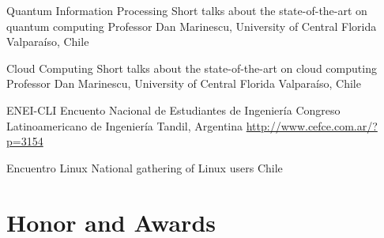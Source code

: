 \documentclass[11pt,a4paper]{moderncv}
\begin{document}
        {Quantum Information Processing}
        {Short talks about the state-of-the-art on quantum computing}
        {Professor Dan Marinescu, University of Central Florida}
        {Valparaíso, Chile}
        {}
        
        {Cloud Computing}
        {Short talks about the state-of-the-art on cloud computing}
        {Professor Dan Marinescu, University of Central Florida}
        {Valparaíso, Chile}
        {}

        {ENEI-CLI}
        {Encuento Nacional de Estudiantes de Ingeniería}
        {Congreso Latinoamericano de Ingeniería}
        {Tandil, Argentina}
        {\url{http://www.cefce.com.ar/?p=3154}}

        {Encuentro Linux}
        {National gathering of Linux users}
        {Chile}
        {}
        {}
        
\section{Honor and Awards}


\end{document}
